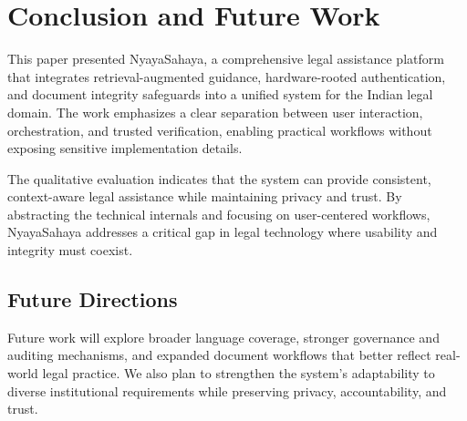 \section{Conclusion and Future Work}
\label{sec:conclusion}

This paper presented NyayaSahaya, a comprehensive legal assistance platform that integrates retrieval-augmented guidance, hardware-rooted authentication, and document integrity safeguards into a unified system for the Indian legal domain. The work emphasizes a clear separation between user interaction, orchestration, and trusted verification, enabling practical workflows without exposing sensitive implementation details.

The qualitative evaluation indicates that the system can provide consistent, context-aware legal assistance while maintaining privacy and trust. By abstracting the technical internals and focusing on user-centered workflows, NyayaSahaya addresses a critical gap in legal technology where usability and integrity must coexist.

\subsection{Future Directions}

Future work will explore broader language coverage, stronger governance and auditing mechanisms, and expanded document workflows that better reflect real-world legal practice. We also plan to strengthen the system's adaptability to diverse institutional requirements while preserving privacy, accountability, and trust.
